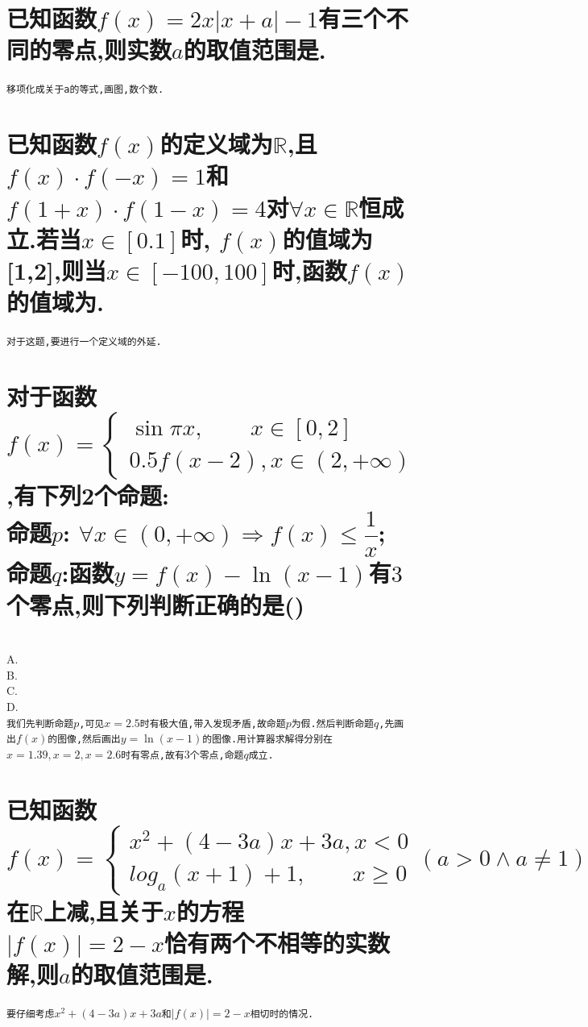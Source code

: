\documentclass[oneside]{book}
\newcommand{\1}{\underline{\makebox[1cm]{}}}
\newcommand{\2}{\underline{\makebox[2cm]{}}}
\newcommand{\3}{\underline{\makebox[3cm]{}}}
\newcommand{\4}{\underline{\makebox[4cm]{}}}
\newcommand{\lge}{\large \texttt}
\newlength{\la}
\begin{document}
        \section{已知函数$f(x)=2x|x+a|-1$有三个不同的零点,则实数$a$的取值范围是\3.}
        \lge{移项化成关于a的等式,画图,数个数.}
        
        \section{已知函数$f(x)$的定义域为$\mathbb{R}$,且$f(x)\cdot f(-x) =1$和$f(1+x)\cdot f(1-x)=4$对$\forall x\in \mathbb{R}$恒成立.若当$x\in [0.1]$时, $f(x)$的值域为[1,2],则当$x \in [-100,100]$时,函数$f(x)$的值域为\3.}
        \lge{对于这题,要进行一个定义域的外延.}

        \section{对于函数$f(x)=\begin{cases}\sin\pi x,\quad \quad x\in [0,2]\\0.5f(x-2),x\in (2,+\infty)\end{cases}$,有下列2个命题:\\命题$p$: $\forall x\in (0,+\infty)\Rightarrow f(x)\leq \dfrac{1}{x}$;\\命题$q$:函数$y=f(x)-\ln(x-1)$有$3$个零点,则下列判断正确的是(\quad \quad)}
        \quad
        \Large{\\A.\\ B.\\ C.\\ D.}
        \\ \lge{我们先判断命题$p$,可见$x=2.5$时有极大值,带入发现矛盾,故命题$p$为假.然后判断命题$q$,先画出$f(x)$的图像,然后画出$y=\ln(x-1)$的图像.用计算器求解得分别在$x=1.39,x=2,x=2.6$时有零点,故有$3$个零点,命题$q$成立.}

        \section{已知函数$f(x)=\begin{cases} x^2+(4-3a)x+3a, x<0 \\ log_a(x+1)+1, \quad \quad x\geq 0 \end{cases} (a>0\wedge a\neq 1)$在$\mathbb{R}$上减,且关于$x$的方程\\$|f(x)|=2-x$恰有两个不相等的实数解,则$a$的取值范围是\4.}
        \lge{要仔细考虑$x^2+(4-3a)x+3a$和$|f(x)|=2-x$相切时的情况.}
\end{document}
